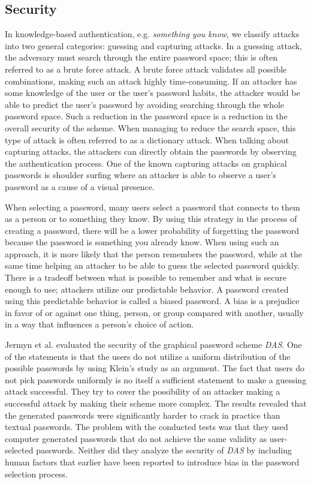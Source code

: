 	\subsection{Security} \label{sec:security}

    In knowledge-based authentication, e.g. {\it something you know}, we classify attacks into two general categories: guessing and capturing attacks. In a guessing attack, the adversary must search through the entire password space; this is often referred to as a brute force attack. A brute force attack validates all possible combinations, making such an attack highly time-consuming. If an attacker has some knowledge of the user or the user’s password habits, the attacker would be able to predict the user's password by avoiding searching through the whole password space. Such a reduction in the password space is a reduction in the overall security of the scheme. When managing to reduce the search space, this type of attack is often referred to as a dictionary attack. When talking about capturing attacks, the attackers can directly obtain the passwords by observing the authentication process. One of the known capturing attacks on graphical passwords is shoulder surfing where an attacker is able to observe a user's password as a cause of a visual presence.

    When selecting a password, many users select a password that connects to them as a person or to something they know. By using this strategy in the process of creating a password, there will be a lower probability of forgetting the password because the password is something you already know. When using such an approach, it is more likely that the person remembers the password, while at the same time helping an attacker to be able to guess the selected password quickly. There is a tradeoff between what is possible to remember and what is secure enough to use; attackers utilize our predictable behavior. A password created using this predictable behavior is called a biased password. A bias is a prejudice in favor of or against one thing, person, or group compared with another, usually in a way that influences a person's choice of action.

    Jermyn et al. \cite{Jermyn} evaluated the security of the graphical password scheme {\it DAS}. One of the statements is that the users do not utilize a uniform distribution of the possible passwords by using Klein's study \cite{UnixPasswords} as an argument. The fact that users do not pick passwords uniformly is no itself a sufficient statement to make a guessing attack successful. They try to cover the possibility of an attacker making a successful attack by making their scheme more complex. The results revealed that the generated passwords were significantly harder to crack in practice than textual passwords. The problem with the conducted tests was that they used computer generated passwords that do not achieve the same validity as user-selected passwords. Neither did they analyze the security of {\it DAS} by including human factors that earlier have been reported to introduce bias in the password selection process.

